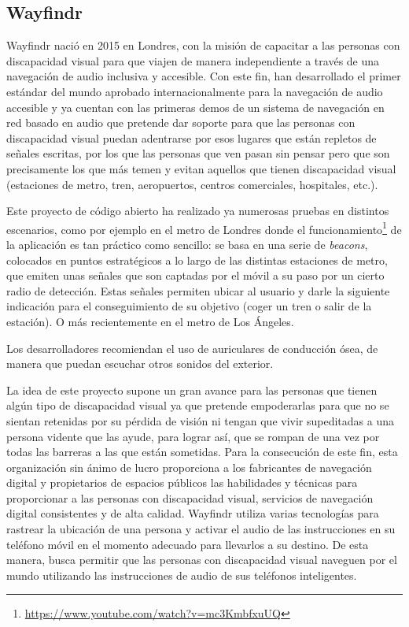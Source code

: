 \subsection{Wayfindr} 
Wayfindr \citep{wayfindrOnline} nació en 2015 en Londres, con la misión de capacitar a las personas con discapacidad visual para que viajen de manera independiente a través de una navegación de audio inclusiva y accesible. Con este fin, han desarrollado el primer estándar del mundo aprobado internacionalmente para la navegación de audio accesible y ya cuentan con las primeras demos de un sistema de navegación en red basado en audio que pretende dar soporte para que las personas con discapacidad visual puedan adentrarse por esos lugares que están repletos de señales escritas, por los que las personas que ven pasan sin pensar pero que son precisamente los que más temen y evitan aquellos que tienen discapacidad visual (estaciones de metro, tren, aeropuertos, centros comerciales, hospitales, etc.). 

Este proyecto de código abierto ha realizado ya numerosas pruebas en distintos escenarios, como por ejemplo en el metro de Londres donde el funcionamiento\footnote{\url{https://www.youtube.com/watch?v=mc3KmbfxuUQ}} de la aplicación es tan práctico como sencillo: se basa en una serie de \textit{beacons}, colocados en puntos estratégicos a lo largo de las distintas estaciones de metro, que emiten unas señales que son captadas por el móvil a su paso por un cierto radio de detección. Estas señales permiten ubicar al usuario y darle la siguiente indicación para el conseguimiento de su objetivo (coger un tren o salir de la estación). O más recientemente en el metro de Los Ángeles.

Los desarrolladores recomiendan el uso de auriculares de conducción ósea, de manera que puedan escuchar otros sonidos del exterior.

La idea de este proyecto supone un gran avance para las personas que tienen algún tipo de discapacidad visual ya que pretende empoderarlas para que no se sientan retenidas por su pérdida de visión ni tengan que vivir supeditadas a una persona vidente que las ayude, para lograr así, que se rompan de una vez por todas las barreras a las que están sometidas. Para la consecución de este fin, esta organización sin ánimo de lucro proporciona a los fabricantes de navegación digital y propietarios de espacios públicos las habilidades y técnicas para proporcionar a las personas con discapacidad visual, servicios de navegación digital consistentes y de alta calidad. Wayfindr utiliza varias tecnologías para rastrear la ubicación de una persona y activar el audio de las instrucciones en su teléfono móvil en el momento adecuado para llevarlos a su destino. De esta manera, busca permitir que las personas con discapacidad visual naveguen por el mundo utilizando las instrucciones de audio de sus teléfonos inteligentes.

